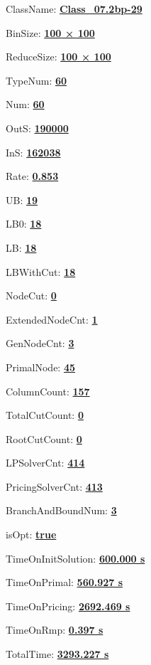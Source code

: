 \documentclass[11pt]{article}
\begin{document}
\pagestyle{empty}


ClassName: \underline{\textbf{Class_07.2bp-29}}
\par
BinSize: \underline{\textbf{100 × 100}}
\par
ReduceSize: \underline{\textbf{100 × 100}}
\par
TypeNum: \underline{\textbf{60}}
\par
Num: \underline{\textbf{60}}
\par
OutS: \underline{\textbf{190000}}
\par
InS: \underline{\textbf{162038}}
\par
Rate: \underline{\textbf{0.853}}
\par
UB: \underline{\textbf{19}}
\par
LB0: \underline{\textbf{18}}
\par
LB: \underline{\textbf{18}}
\par
LBWithCut: \underline{\textbf{18}}
\par
NodeCut: \underline{\textbf{0}}
\par
ExtendedNodeCnt: \underline{\textbf{1}}
\par
GenNodeCnt: \underline{\textbf{3}}
\par
PrimalNode: \underline{\textbf{45}}
\par
ColumnCount: \underline{\textbf{157}}
\par
TotalCutCount: \underline{\textbf{0}}
\par
RootCutCount: \underline{\textbf{0}}
\par
LPSolverCnt: \underline{\textbf{414}}
\par
PricingSolverCnt: \underline{\textbf{413}}
\par
BranchAndBoundNum: \underline{\textbf{3}}
\par
isOpt: \underline{\textbf{true}}
\par
TimeOnInitSolution: \underline{\textbf{600.000 s}}
\par
TimeOnPrimal: \underline{\textbf{560.927 s}}
\par
TimeOnPricing: \underline{\textbf{2692.469 s}}
\par
TimeOnRmp: \underline{\textbf{0.397 s}}
\par
TotalTime: \underline{\textbf{3293.227 s}}
\par
\newpage


\end{document}
